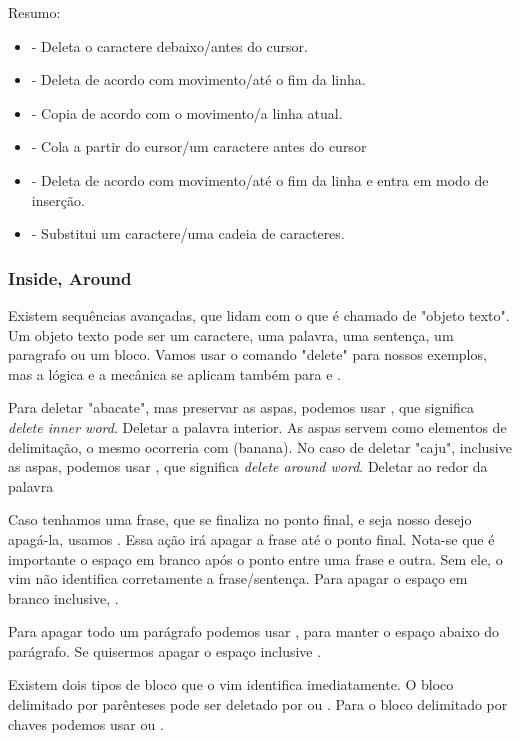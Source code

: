 \documentclass[a4paper, 12pt]{article}
\begin{document}
Resumo:
\begin{itemize}
    \item {} - Deleta o caractere debaixo/antes do cursor.
    \item {} - Deleta de acordo com movimento/até o fim da linha.
    \item {} - Copia de acordo com o movimento/a linha atual.
    \item {} - Cola a partir do cursor/um caractere antes do cursor
    \item {} - Deleta de acordo com movimento/até o fim da linha e entra em modo de inserção.
    \item {} - Substitui um caractere/uma cadeia de caracteres.
\end{itemize}

\subsubsection{Inside, Around}
Existem sequências avançadas, que lidam com o que é chamado de "objeto texto".
Um objeto texto pode ser um caractere, uma palavra, uma sentença, um paragrafo ou um bloco.
Vamos usar o comando "delete" para nossos exemplos, mas a lógica e a mecânica se aplicam também
para  e .

Para deletar "abacate", mas preservar as aspas, podemos usar ,
que significa \textit{delete inner word}. Deletar a palavra interior.
As aspas servem como elementos de delimitação, o mesmo ocorreria com (banana).
No caso de deletar "caju", inclusive as aspas, podemos usar ,
que significa \textit{delete around word}. Deletar ao redor da palavra

Caso tenhamos uma frase, que se finaliza no ponto final,
e seja nosso desejo apagá-la, usamos .
Essa ação irá apagar a frase até o ponto final.
Nota-se que é importante o espaço em branco após o ponto entre uma frase e outra.
Sem ele, o vim não identifica corretamente a frase/sentença.
Para apagar o espaço em branco inclusive, . 

Para apagar todo um parágrafo podemos usar ,
para manter o espaço abaixo do parágrafo.
Se quisermos apagar o espaço inclusive .

Existem dois tipos de bloco que o vim identifica imediatamente.
O bloco delimitado por parênteses pode ser deletado por  ou .
Para o bloco delimitado por chaves podemos usar  ou .
\end{document}
